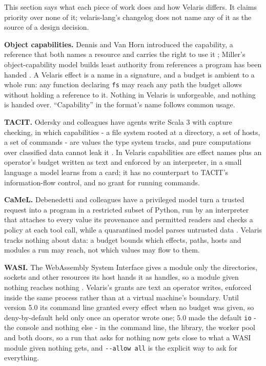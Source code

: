 \documentclass[
]{article}
\newcounter{none} %
\begin{document}
This section says what each piece of work does and how Velaris differs.
It claims priority over none of it; velaris-lang's changelog does not
name any of it as the source of a design decision.

\textbf{Object capabilities.} Dennis and Van Horn introduced the
capability, a reference that both names a resource and carries the right
to use it \citep{dennis1966semantics}; Miller's object-capability model
builds least authority from references a program has been handed
\citep{miller2006robust}. A Velaris effect is a name in a signature, and
a budget is ambient to a whole run: any function declaring \texttt{fs}
may reach any path the budget allows without holding a reference to it.
Nothing in Velaris is unforgeable, and nothing is handed over.
``Capability'' in the format's name follows common usage.

\textbf{TACIT.} Odersky and colleagues have agents write Scala 3 with
capture checking, in which capabilities - a file system rooted at a
directory, a set of hosts, a set of commands - are values the type
system tracks, and pure computations over classified data cannot leak it
\citep{odersky2026tacit}. In Velaris capabilities are effect names plus
an operator's budget written as text and enforced by an interpreter, in
a small language a model learns from a card; it has no counterpart to
TACIT's information-flow control, and no grant for running commands.

\textbf{CaMeL.} Debenedetti and colleagues have a privileged model turn
a trusted request into a program in a restricted subset of Python, run
by an interpreter that attaches to every value its provenance and
permitted readers and checks a policy at each tool call, while a
quarantined model parses untrusted data \citep{debenedetti2025camel}.
Velaris tracks nothing about data: a budget bounds which effects, paths,
hosts and modules a run may reach, not which values may flow to them.

\textbf{WASI.} The WebAssembly System Interface gives a module only the
directories, sockets and other resources its host hands it as handles,
so a module given nothing reaches nothing \citep{wasi}. Velaris's grants
are text an operator writes, enforced inside the same process rather
than at a virtual machine's boundary. Until version 5.0 its command line
granted every effect when no budget was given, so deny-by-default held
only once an operator wrote one; 5.0 made the default \texttt{io} - the
console and nothing else - in the command line, the library, the worker
pool and both doors, so a run that asks for nothing now gets close to
what a WASI module given nothing gets, and \texttt{-\/-allow\ all} is
the explicit way to ask for everything.
\end{document}

